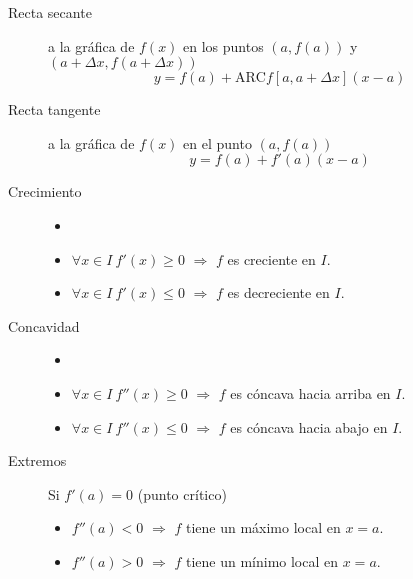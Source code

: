 \begin{multicols}{2}
	\begin{tcolorbox}[hbox, title=Rectas secante y tangente]
		\begin{minipage}{0.4\textwidth}
			\flushleft
			\begin{description}
				\item[Recta secante] a la gráfica de $f(x)$ en los puntos $(a,f(a))$ y $(a+\Delta x, f(a+\Delta x))$
				      \[
					      y=f(a)+\mbox{ARC}f[a,a+\Delta x](x-a)
				      \]
				\item[Recta tangente] a la gráfica de $f(x)$ en el punto $(a,f(a))$
				      \[
					      y=f(a)+f'(a)(x-a)
				      \]
			\end{description}
		\end{minipage}
	\end{tcolorbox}

	\begin{tcolorbox}[hbox, title={Crecimiento, concavidad y extremos}]
		\begin{minipage}{0.4\textwidth}
			\flushleft
			\begin{description}
				\item[Crecimiento]
				      \begin{itemize}
					      \item[]
					      \item $\forall x\in I\ f'(x)\geq 0$ $\Rightarrow$ $f$ es creciente en $I$.
					      \item $\forall x\in I\ f'(x)\leq 0$ $\Rightarrow$ $f$ es decreciente en $I$.
				      \end{itemize}
				\item[Concavidad]
				      \begin{itemize}
					      \item[]
					      \item $\forall x\in I\ f''(x)\geq 0$ $\Rightarrow$ $f$ es cóncava hacia arriba en $I$.
					      \item $\forall x\in I\ f''(x)\leq 0$ $\Rightarrow$ $f$ es cóncava hacia abajo en $I$.
				      \end{itemize}
				\item[Extremos] Si $f'(a)=0$ (punto crítico)
				      \begin{itemize}
					      \item $f''(a)<0$ $\Rightarrow$ $f$ tiene un máximo local en $x=a$.
					      \item $f''(a)>0$ $\Rightarrow$ $f$ tiene un mínimo local en $x=a$.
				      \end{itemize}
			\end{description}
		\end{minipage}
	\end{tcolorbox}


\end{multicols}
